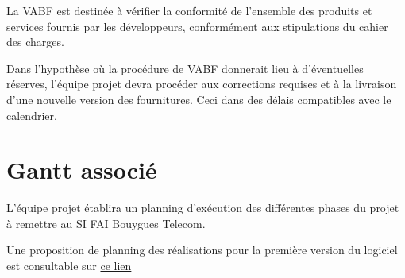 \documentclass{bouygues-fr}
\begin{document}
La VABF est destinée à vérifier la conformité de l’ensemble des produits et services fournis par les développeurs, conformément aux stipulations du cahier des charges.

Dans l’hypothèse où la procédure de VABF donnerait lieu à d'éventuelles réserves, l'équipe projet devra procéder aux corrections   requises   et   à   la livraison d’une   nouvelle   version   des fournitures. Ceci dans des délais compatibles avec le calendrier.

\vspace{20pt}
\section {Gantt associé}
L'équipe projet établira un planning d’exécution des différentes phases du projet à remettre au SI FAI Bouygues Telecom.

Une proposition de planning des réalisations pour la première version du logiciel est consultable sur \href{https://mcp-d.admin.dolmen.bouyguestelecom.fr/fancycron/Planning/PlanningFancyCron.html}{ce lien}


\end{document}

